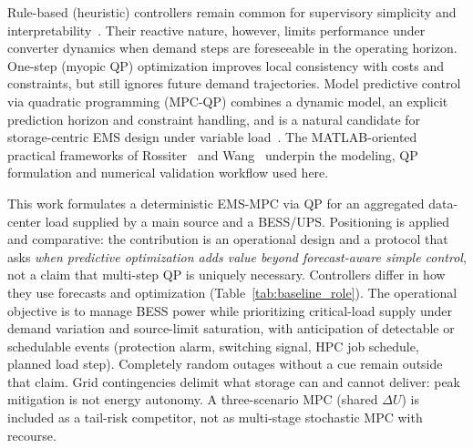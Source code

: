 \documentclass{ieeeaccess}
\begin{document}
Rule-based (heuristic) controllers remain common for supervisory simplicity and interpretability~\cite{passino1998fuzzy,astrom1997computer}. Their reactive nature, however, limits performance under converter dynamics when demand steps are foreseeable in the operating horizon. One-step (myopic QP) optimization improves local consistency with costs and constraints, but still ignores future demand trajectories. Model predictive control via quadratic programming (MPC-QP) combines a dynamic model, an explicit prediction horizon and constraint handling, and is a natural candidate for storage-centric EMS design under variable load~\cite{camacho2007mpc,rossiter2003mpc,wang2009mpc,parisio2014mpc,wang2023hierarchical,nair2020mpc,sepehrzad2023mpc}. The MATLAB-oriented practical frameworks of Rossiter~\cite{rossiter2003mpc} and Wang~\cite{wang2009mpc} underpin the modeling, QP formulation and numerical validation workflow used here.

This work formulates a deterministic EMS-MPC via QP for an aggregated data-center load supplied by a main source and a BESS/UPS. Positioning is applied and comparative: the contribution is an operational design and a protocol that asks \emph{when predictive optimization adds value beyond forecast-aware simple control}, not a claim that multi-step QP is uniquely necessary. Controllers differ in how they use forecasts and optimization (Table~\ref{tab:baseline_role}). The operational objective is to manage BESS power while prioritizing critical-load supply under demand variation and source-limit saturation, with anticipation of detectable or schedulable events (protection alarm, switching signal, HPC job schedule, planned load step). Completely random outages without a cue remain outside that claim. Grid contingencies delimit what storage can and cannot deliver: peak mitigation is not energy autonomy. A three-scenario MPC (shared $\Delta U$) is included as a tail-risk competitor, not as multi-stage stochastic MPC with recourse.
\end{document}
